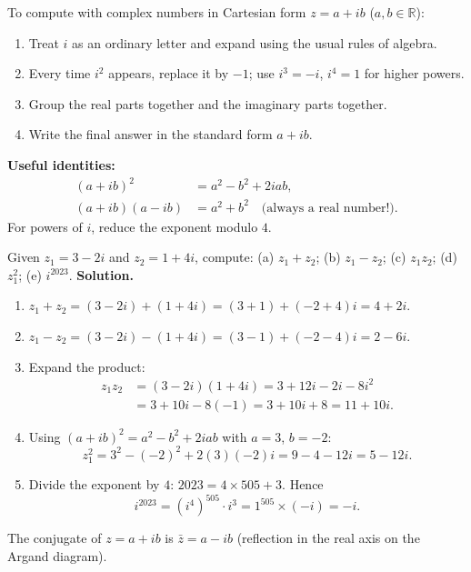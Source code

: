 \documentclass[11pt]{article}
\newcommand{\cle}[1]{{\popxbold\color{popdark}#1}}
\begin{document}
\begin{methode}
To compute with complex numbers in \cle{Cartesian form} $z = a + ib$ ($a,b\in\mathbb{R}$):
\begin{enumerate}
\item Treat $i$ as an ordinary letter and expand using the usual rules of algebra.
\item Every time $i^2$ appears, replace it by $-1$; use $i^3 = -i$, $i^4 = 1$ for higher powers.
\item Group the \cle{real parts} together and the \cle{imaginary parts} together.
\item Write the final answer in the standard form $a + ib$.
\end{enumerate}
\textbf{Useful identities:}
\begin{align*}
(a+ib)^2 &= a^2 - b^2 + 2iab, \\
(a+ib)(a-ib) &= a^2 + b^2 \quad\text{(always a real number!)}.
\end{align*}
For powers of $i$, reduce the exponent modulo $4$.
\end{methode}

\begin{exoresolu}
Given $z_1 = 3 - 2i$ and $z_2 = 1 + 4i$, compute: (a) $z_1 + z_2$; (b) $z_1 - z_2$; (c) $z_1 z_2$; (d) $z_1^2$; (e) $i^{2023}$.
\tcblower
\textbf{Solution.}
\begin{enumerate}
\item[(a)] $z_1 + z_2 = (3 - 2i) + (1 + 4i) = (3+1) + (-2+4)i = 4 + 2i$.
\item[(b)] $z_1 - z_2 = (3 - 2i) - (1 + 4i) = (3-1) + (-2-4)i = 2 - 6i$.
\item[(c)] Expand the product:
\begin{align*}
z_1 z_2 &= (3 - 2i)(1 + 4i) = 3 + 12i - 2i - 8i^2 \\
&= 3 + 10i - 8(-1) = 3 + 10i + 8 = 11 + 10i.
\end{align*}
\item[(d)] Using $(a+ib)^2 = a^2 - b^2 + 2iab$ with $a = 3$, $b = -2$:
\[ z_1^2 = 3^2 - (-2)^2 + 2(3)(-2)i = 9 - 4 - 12i = 5 - 12i. \]
\item[(e)] Divide the exponent by $4$: $2023 = 4 \times 505 + 3$. Hence
\[ i^{2023} = (i^4)^{505} \cdot i^3 = 1^{505} \times (-i) = -i. \]
\end{enumerate}
\end{exoresolu}

\begin{definition}
The \cle{conjugate} of $z = a + ib$ is $\bar{z} = a - ib$ (reflection in the real axis on the Argand diagram).
\end{definition}
\end{document}
